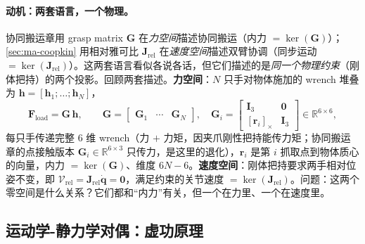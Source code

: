 \paragraph{动机：两套语言，一个物理。}
协同搬运章用 grasp matrix $\mathbf{G}$ 在\emph{力空间}描述协同搬运（内力 $=\ker(\mathbf{G})$）；\cref{sec:ma-coopkin} 用相对雅可比 $\mathbf{J}_{\text{rel}}$ 在\emph{速度空间}描述双臂协调（同步运动 $=\ker(\mathbf{J}_{\text{rel}})$）。这两套语言看似各说各话，但它们描述的是\emph{同一个物理约束}（刚体把持）的两个投影。回顾两套描述。\textbf{力空间}：$N$ 只手对物体施加的 wrench 堆叠为 $\mathbf{h}=[\mathbf{h}_1;\dots;\mathbf{h}_N]$，
\begin{equation}
  \mathbf{F}_{\text{load}}=\mathbf{G}\,\mathbf{h},\qquad
  \mathbf{G}=\begin{bmatrix}\mathbf{G}_1 & \cdots & \mathbf{G}_N\end{bmatrix},\quad
  \mathbf{G}_i=\begin{bmatrix}\mathbf{I}_3 & \mathbf{0}\\ [\mathbf{r}_i]_\times & \mathbf{I}_3\end{bmatrix}\in\mathbb{R}^{6\times6},
  \label{eq:ma-grasp}
\end{equation}
每只手传递完整 $6$ 维 wrench（力 $+$ 力矩，因夹爪刚性把持能传力矩；协同搬运章的点接触版本 $\mathbf{G}_i\in\mathbb{R}^{6\times3}$ 只传力，是这里的退化），$\mathbf{r}_i$ 是第 $i$ 抓取点到物体质心的向量，内力 $=\ker(\mathbf{G})$、维度 $6N-6$。\textbf{速度空间}：刚体把持要求两手相对位姿不变，即 $\boldsymbol{\mathcal{V}}_{\text{rel}}=\mathbf{J}_{\text{rel}}\dot{\mathbf{q}}=\mathbf{0}$，满足约束的关节速度 $=\ker(\mathbf{J}_{\text{rel}})$。问题：这两个零空间是什么关系？它们都和“内力”有关，但一个在力里、一个在速度里。

\subsection{运动学-静力学对偶：虚功原理}
\label{sec:ma-vwork}


